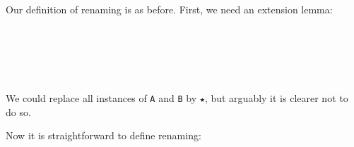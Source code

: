 Our definition of renaming is as before. First, we need an extension
lemma:

\begin{fence}
\begin{code}%
\>[0]%
\>[270I]\AgdaSymbol{:}\AgdaSpace{}%
\AgdaSpace{}%
\AgdaSymbol{\{}\AgdaSpace{}%
\AgdaSymbol{\}}\AgdaSpace{}%
\AgdaSpace{}%
\AgdaSpace{}%
\AgdaSymbol{\{}\AgdaSymbol{\}}\AgdaSpace{}%
\AgdaSpace{}%
\AgdaSpace{}%
\AgdaSpace{}%
\AgdaSpace{}%
\AgdaSpace{}%
\AgdaSpace{}%
\AgdaSpace{}%
\AgdaSymbol{)}\<%
\\
\>[.][@{}l@{}]\<[270I]%
\>[4]\AgdaComment{-----------------------------------}\<%
\\
\>[0][@{}l@{\AgdaIndent{0}}]%
\>[2]\AgdaSpace{}%
\AgdaSpace{}%
\AgdaSymbol{\{}\AgdaSpace{}%
\AgdaSymbol{\}}\AgdaSpace{}%
\AgdaSpace{}%
\AgdaSpace{}%
\AgdaOperator{\AgdaInductiveConstructor{,}}\AgdaSpace{}%
\AgdaSpace{}%
\AgdaSpace{}%
\AgdaSpace{}%
\AgdaSpace{}%
\AgdaSpace{}%
\AgdaOperator{\AgdaInductiveConstructor{,}}\AgdaSpace{}%
\AgdaSpace{}%
\AgdaSpace{}%
\AgdaSymbol{)}\<%
\\
\>[0]\AgdaSpace{}%
\AgdaSpace{}%
%
\>[13]\AgdaSymbol{=}%
\>[16]\<%
\\
\>[0]\AgdaSpace{}%
\AgdaSpace{}%
\AgdaSymbol{(}\AgdaSpace{}%
\AgdaSymbol{)}%
\>[13]\AgdaSymbol{=}%
\>[16]\AgdaSpace{}%
\AgdaSymbol{(}\AgdaSpace{}%
\AgdaSymbol{)}\<%
\end{code}
\end{fence}

We could replace all instances of \texttt{A} and \texttt{B} by
\texttt{★}, but arguably it is clearer not to do so.

Now it is straightforward to define renaming:

